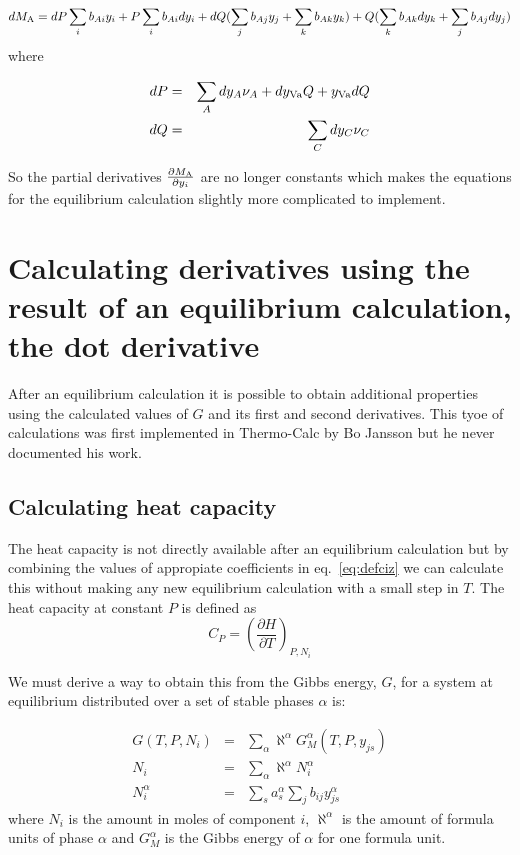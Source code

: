 \documentclass[12pt]{article}
\begin{document}
\begin{eqnarray}
dM_{\rm A} = dP\sum_i b_{Ai}y_i+P\sum_i b_{Ai}dy_i+
dQ(\sum_j b_{Aj}y_j+\sum_k b_{Ak}y_k)+
Q(\sum_k b_{Ak}dy_k +\sum_j b_{Aj}dy_j)\nonumber\\
\end{eqnarray}
where

\begin{eqnarray}
dP &=& \sum_A dy_A \nu_A + dy_{\rm Va} Q + y_{\rm Va} dQ \\
dQ &=& \sum_C dy_C \nu_C
\end{eqnarray}

So the partial derivatives $\frac{\partial M_{\rm A}}{\partial y_i}$
are no longer constants which makes the equations for the equilibrium
calculation slightly more complicated to implement.

\section{Calculating derivatives using the result of an equilibrium
calculation, the dot derivative}\label{sc:dotder}

After an equilibrium calculation it is possible to obtain additional
properties using the calculated values of $G$ and its first and second
derivatives.  This tyoe of calculations was first implemented in
Thermo-Calc by Bo Jansson but he never documented his work.

\subsection{Calculating heat capacity}


The heat capacity is not directly available after an equilibrium
calculation but by combining the values of appropiate coefficients in
eq.~\ref{eq:defciz} we can calculate this without making any new
equilibrium calculation with a small step in $T$.  The heat capacity
at constant $P$ is defined as
\begin{equation}
C_P = \left(\frac{\partial H}{\partial T}\right)_{P, N_i}
\end{equation}

We must derive a way to obtain this from the Gibbs energy, $G$, for a
system at equilibrium distributed over a set of stable phases $\alpha$
is:

\begin{eqnarray}
G(T,P,N_i) &=& \sum_{\alpha} \aleph^{\alpha} G_M^{\alpha}(T,P,y_{js})\\
N_i &=& \sum_{\alpha} \aleph^{\alpha} N_i^{\alpha}\\
N_i^{\alpha} &=& \sum_s a_s^{\alpha} \sum_j b_{ij} y_{js}^{\alpha}
\end{eqnarray}
where $N_i$ is the amount in moles of component $i$, $\aleph^{\alpha}$
is the amount of formula units of phase $\alpha$ and $G_M^{\alpha}$ is
the Gibbs energy of $\alpha$ for one formula unit.  
\end{document}
